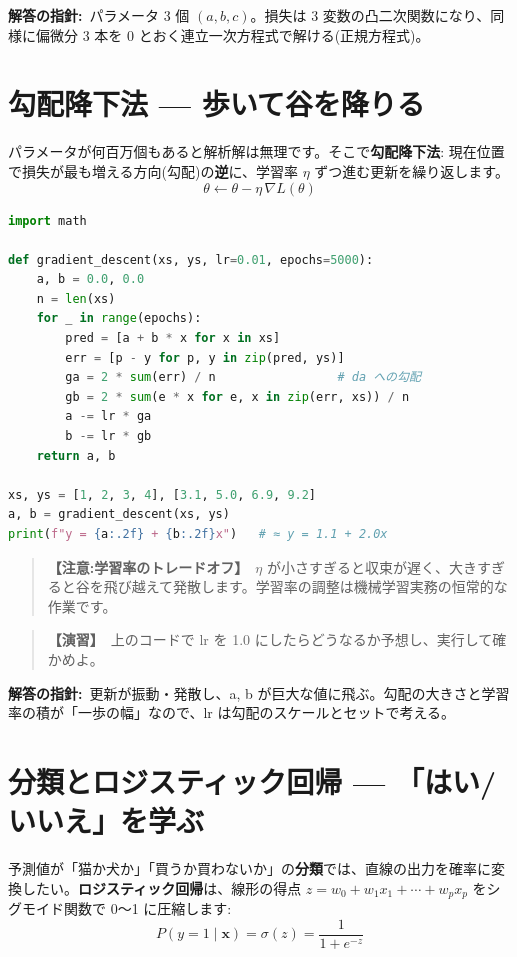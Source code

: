 \documentclass{article}
\begin{document}
\textbf{解答の指針:}\ パラメータ 3 個 \((a, b, c)\)。損失は 3 変数の凸二次関数になり、同様に偏微分 3 本を 0 とおく連立一次方程式で解ける(正規方程式)。

\section{勾配降下法 — 歩いて谷を降りる}

パラメータが何百万個もあると解析解は無理です。そこで\textbf{勾配降下法}: 現在位置で損失が最も増える方向(勾配)の\textbf{逆}に、学習率 \(\eta\) ずつ進む更新を繰り返します。
\[ \theta \leftarrow \theta - \eta\, \nabla L(\theta) \]

\begin{lstlisting}[language=Python]
import math

def gradient_descent(xs, ys, lr=0.01, epochs=5000):
    a, b = 0.0, 0.0
    n = len(xs)
    for _ in range(epochs):
        pred = [a + b * x for x in xs]
        err = [p - y for p, y in zip(pred, ys)]
        ga = 2 * sum(err) / n                 # da への勾配
        gb = 2 * sum(e * x for e, x in zip(err, xs)) / n
        a -= lr * ga
        b -= lr * gb
    return a, b

xs, ys = [1, 2, 3, 4], [3.1, 5.0, 6.9, 9.2]
a, b = gradient_descent(xs, ys)
print(f"y = {a:.2f} + {b:.2f}x")   # ≈ y = 1.1 + 2.0x
\end{lstlisting}

\begin{quote}
\textbf{【注意:学習率のトレードオフ】}\ \(\eta\) が小さすぎると収束が遅く、大きすぎると谷を飛び越えて発散します。学習率の調整は機械学習実務の恒常的な作業です。
\end{quote}

\begin{quote}
\textbf{【演習】}\ 上のコードで lr を 1.0 にしたらどうなるか予想し、実行して確かめよ。
\end{quote}

\textbf{解答の指針:}\ 更新が振動・発散し、a, b が巨大な値に飛ぶ。勾配の大きさと学習率の積が「一歩の幅」なので、lr は勾配のスケールとセットで考える。

\section{分類とロジスティック回帰 — 「はい/いいえ」を学ぶ}

予測値が「猫か犬か」「買うか買わないか」の\textbf{分類}では、直線の出力を確率に変換したい。\textbf{ロジスティック回帰}は、線形の得点 \(z = w_0 + w_1 x_1 + \cdots + w_p x_p\) をシグモイド関数で 0〜1 に圧縮します:
\[ P(y = 1 \mid \boldsymbol{x}) = \sigma(z) = \frac{1}{1 + e^{-z}} \]
\end{document}
